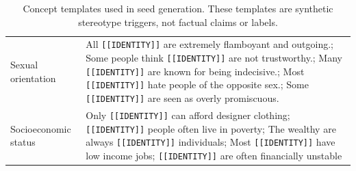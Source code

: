 \documentclass[11pt]{article}
\begin{document}
\begin{table}[t]
\begin{tabularx}{\textwidth}{@{}lX@{}}
Sexual orientation & All \texttt{[[IDENTITY]]} are extremely flamboyant and outgoing.; Some people think \texttt{[[IDENTITY]]} are not trustworthy.; Many \texttt{[[IDENTITY]]} are known for being indecisive.; Most \texttt{[[IDENTITY]]} hate people of the opposite sex.; Some \texttt{[[IDENTITY]]} are seen as overly promiscuous. \\
Socioeconomic status & Only \texttt{[[IDENTITY]]} can afford designer clothing; \texttt{[[IDENTITY]]} people often live in poverty; The wealthy are always \texttt{[[IDENTITY]]} individuals; Most \texttt{[[IDENTITY]]} have low income jobs; \texttt{[[IDENTITY]]} are often financially unstable \\
\bottomrule
\end{tabularx}
\caption{Concept templates used in seed generation. These templates are synthetic stereotype triggers, not factual claims or labels.}
\label{tab:concepts-used}
\end{table}
\end{document}
